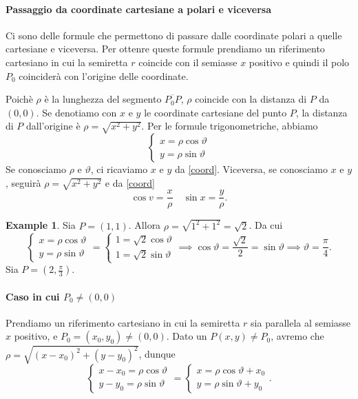 \documentclass{article}
\theoremstyle{plain}
\theoremstyle{definition}
\newtheorem{exmp}{Example}[section]
\theoremstyle{remark}
\begin{document}
\paragraph{Passaggio da coordinate cartesiane a polari e viceversa}
Ci sono delle formule che permettono di passare dalle coordinate polari a quelle cartesiane e viceversa. 
Per ottenre queste formule prendiamo un riferimento cartesiano in cui la semiretta $r$ coincide con il semiasse $x$ positivo e quindi il polo $P_0$ coinciderà con l'origine delle coordinate.

Poichè $\rho$ è la lunghezza del segmento $\overline{P_0P}$, $\rho$ coincide con la distanza di $P$ da $(0,0)$. 
Se denotiamo con $x$ e $y$ le coordinate cartesiane del punto $P$, 
la distanza di $P$ dall'origine è $\rho=\sqrt{x^2+y^2}$.
Per le formule trigonometriche, abbiamo
\begin{equation}
    \begin{cases}
        x=\rho\cos \vartheta\\
        y=\rho\sin \vartheta
    \end{cases}\label{coord}  
\end{equation}
Se conosciamo $\rho$ e $\vartheta$, ci ricaviamo $x$ e $y$ da \ref{coord}. 
Viceversa, se conosciamo $x$ e $y$, seguirà $\rho=\sqrt{x^2+y^2}$ e da \ref{coord} 
\[\cos v=\dfrac{x}{\rho}\quad \sin x=\dfrac{y}{\rho}.\]

\vspace{10pt}

\begin{exmp}
    Sia $P=(1,1)$. Allora $\rho=\sqrt{1^2+1^2}=\sqrt{2}$. Da cui 
    \[\begin{cases}
        x=\rho\cos\vartheta\\
        y=\rho\sin\vartheta
    \end{cases}=\begin{cases}
        1=\sqrt{2}\cos\vartheta\\
        1=\sqrt{2}\sin\vartheta
    \end{cases}\implies \cos\vartheta=\dfrac{\sqrt{2}}{2}=\sin\vartheta\implies \vartheta=\dfrac{\pi}{4}.\]
    Sia $P=(2,\frac{\pi}{3})$.
\end{exmp}

\vspace{10pt}

\paragraph{Caso in cui $P_0\neq(0,0)$}
Prendiamo un riferimento cartesiano in cui la semiretta $r$ sia parallela al semiasse $x$ positivo, e $P_0=(x_0,y_0)\neq(0,0)$.
Dato un $P(x,y)\neq P_0$, avremo che $\rho=\sqrt{(x-x_0)^2+(y-y_0)^2}$, dunque 
\[\begin{cases}
        x-x_0=\rho\cos\vartheta\\
        y-y_0=\rho\sin\vartheta
    \end{cases}=\begin{cases}
        x=\rho\cos\vartheta+x_0\\
        y=\rho\sin\vartheta+y_0
    \end{cases}.\]
\end{document}
